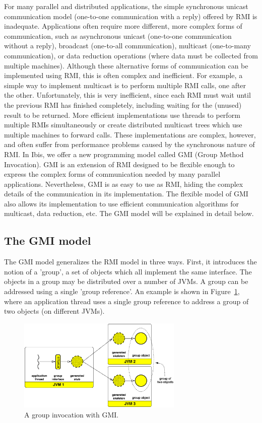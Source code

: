 \documentclass[10pt]{article}
\newcommand{\mysubsection}[1]{\subsection{#1}\label{#1}}
\begin{document}
For many parallel and distributed applications, the simple synchronous
unicast communication model (one-to-one communication with a reply)
offered by RMI is inadequate.  Applications often require more
different, more complex forms of communication, such as asynchronous
unicast (one-to-one communication without a reply), broadcast
(one-to-all communication), multicast (one-to-many communication), or
data reduction operations (where data must be collected from multiple
machines).  Although these alternative forms of communication can be
implemented using RMI, this is often complex and inefficient. For
example, a simple way to implement multicast is to perform multiple
RMI calls, one after the other. Unfortunately, this is very
inefficient, since each RMI must wait until the previous RMI has
finished completely, including waiting for the (unused) result to be
returned. More efficient implementations use threads to perform
multiple RMIs simultaneously or create distributed multicast trees
which use multiple machines to forward calls. These implementations
are complex, however, and often suffer from performance problems
caused by the synchronous nature of RMI.  In Ibis, we offer a new
programming model called GMI (Group Method Invocation). GMI is an
extension of RMI designed to be flexible enough to express the complex
forms of communication needed by many parallel
applications. Nevertheless, GMI is as easy to use as RMI, hiding the
complex details of the communication in its implementation. The
flexible model of GMI also allows its implementation to use efficient
communication algorithms for multicast, data reduction, etc. The GMI
model will be explained in detail below.


\mysubsection{The GMI model}

The GMI model generalizes the RMI model in three ways. First, it
introduces the notion of a 'group', a set of objects which all
implement the same interface. The objects in a group may be
distributed over a number of JVMs. A group can be addressed using a
single 'group reference'. An example is shown in Figure~\ref{gmi-fig}, where an
application thread uses a single group reference to address a group of
two objects (on different JVMs).

\begin{figure}[t]
\begin{center}
\includegraphics[width=0.7\textwidth]{gmi-abstract.eps}
\end{center}
\caption{A group invocation with GMI.}
\label{gmi-fig}
\end{figure}
\end{document}
